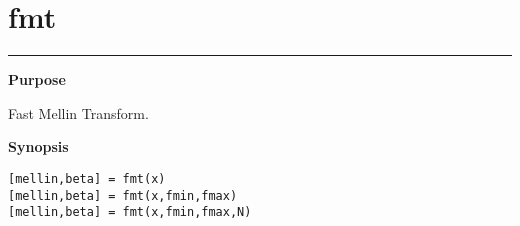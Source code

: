 

\section*{\hspace*{-1.6cm} fmt}

\vspace*{-.4cm}
\hspace*{-1.6cm}\rule[0in]{16.5cm}{.02cm}
\vspace*{.2cm}



{\bf \large \sf Purpose}\\
\hspace*{1.5cm}
\begin{minipage}[t]{13.5cm}
Fast Mellin Transform.
\end{minipage}
\vspace*{.5cm}


{\bf \large \sf Synopsis}\\
\hspace*{1.5cm}
\begin{minipage}[t]{13.5cm}
\begin{verbatim}
[mellin,beta] = fmt(x)
[mellin,beta] = fmt(x,fmin,fmax)
[mellin,beta] = fmt(x,fmin,fmax,N)
\end{verbatim}
\end{minipage}
\vspace*{.5cm}


